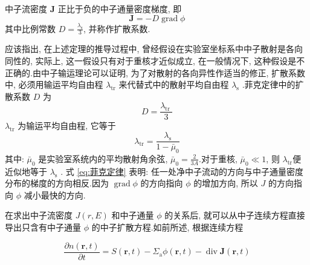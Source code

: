 \documentclass{Sichuan Normal University}
\begin{document}
\begin{theorem}[菲克定律]
    中子流密度 $\boldsymbol{J}$ 正比于负的中子通量密度梯度, 即
    \begin{equation}
    \boldsymbol{J}=-D \operatorname{grad} \phi
    \label{eq:菲克定律}
\end{equation}
    其中比例常数 $D=\frac{\lambda_{\mathrm{s}}}{3}$, 并称作扩散系数.
\end{theorem}

应该指出, 在上述定理的推导过程中, 曾经假设在实验室坐标系中中子散射是各向同性的, 实际上, 这一假设只有对于重核才近似成立, 在一般情况下, 这种假设是不正确的.由中子输运理论可以证明, 为了对散射的各向异性作适当的修正, 扩散系数中, 必须用输运平均自由程 $\lambda_{\mathrm{tr}}$ 来代替式中的散射平均自由程 $\lambda_{\mathrm{s}}$ .菲克定律中的扩散系数 $D$ 为
\begin{equation}
    D=\frac{\lambda_{\text {tr }}}{3}
    \label{eq:扩散系数}
\end{equation}
    $\lambda_{\mathrm{tr}}$ 为输运平均自由程, 它等于
\begin{equation}
    \lambda_{\mathrm{tr}}=\frac{\lambda_{\mathrm{s}}}{1-\bar{\mu}_0}
    \label{eq:输运平均自由程}
\end{equation}其中: $\bar{\mu}_0$ 是实验室系统内的平均散射角余弦\cite{XieZhongShengHeFanYingDuiWuLiFenXi2020}, $\bar{\mu}_0=\frac{2}{3 A}$.对于重核, $\bar{\mu}_0 \ll 1$, 则 $\lambda_{\mathrm{tr}}$便近似地等于 $\lambda_{\mathrm{s}}$ .
式 \eqref{eq:菲克定律} 表明: 任一处净中子流动的方向与中子通量密度分布的梯度的方向相反.因为 $\operatorname{grad} \phi$ 的方向指向 $\phi$ 的增加方向, 所以 $J$ 的方向指向 $\phi$ 减小最快的方向.


在求出中子流密度 $J(r, E)$ 和中子通量 $\phi$ 的关系后, 就可以从中子连续方程直接导出只含有中子通量 $\phi$ 的中子扩散方程.如前所述, 根据连续方程

\begin{equation}
    \frac{\partial n(\boldsymbol{r}, t)}{\partial t}=S(\boldsymbol{r}, t)-\Sigma_{\mathrm{a}} \phi(\boldsymbol{r}, t)-\operatorname{div} \boldsymbol{J}(\boldsymbol{r}, t)
\end{equation}
\end{document}
